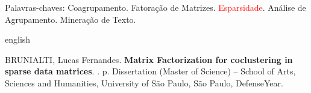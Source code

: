 \documentclass[
    12pt,                %
    oneside,            %
    a4paper,            %
    english,            %
    brazil                %
    ]{abntex2ppgsi}
\begin{document}
\begin{resumo}
Palavras-chaves: Coagrupamento. Fatoração de Matrizes. \textcolor{red}{Esparsidade}. Análise de Agrupamento. Mineração de Texto.
\end{resumo}

%
%
\begin{resumo}[Abstract]
\begin{otherlanguage*}{english}

%
%
%
%
\begin{flushleft}
BRUNIALTI, Lucas Fernandes. \textbf{Matrix Factorization for coclustering in sparse data matrices}. \imprimirdata. \pageref{LastPage} p. Dissertation (Master of Science) – School of Arts, Sciences and Humanities, University of São Paulo, São Paulo, DefenseYear.
\end{flushleft}


\end{otherlanguage*}
\end{resumo}
\end{document}
